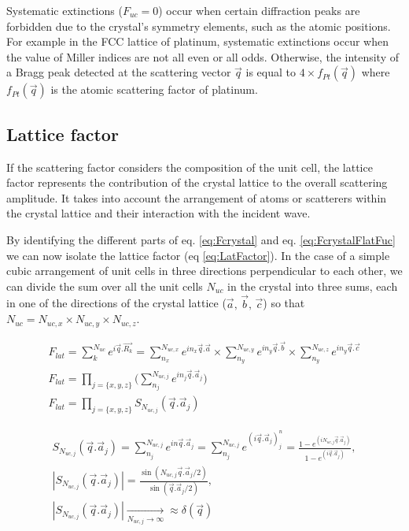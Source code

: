 Systematic extinctions ($F_{uc} = 0$) occur when certain diffraction peaks are forbidden due to the crystal's symmetry elements, such as the atomic positions.
For example in the FCC lattice of platinum, systematic extinctions occur when the value of Miller indices are not all even or all odds.
Otherwise, the intensity of a Bragg peak detected at the scattering vector $\vec{q}$ is equal to $4\times f_{Pt}(\vec{q})$ where $f_{Pt}(\vec{q})$ is the atomic scattering factor of platinum.

\subsection{Lattice factor} \label{sec:LatticeFactor}

If the scattering factor considers the composition of the unit cell, the lattice factor represents the contribution of the crystal lattice to the overall scattering amplitude.
It takes into account the arrangement of atoms or scatterers within the crystal lattice and their interaction with the incident wave.

By identifying the different parts of eq. \ref{eq:Fcrystal} and eq. \ref{eq:FcrystalFlatFuc} we can now isolate the lattice factor (eq \ref{eq:LatFactor}).
In the case of a simple cubic arrangement of unit cells in three directions perpendicular to each other, we can divide the sum over all the unit cells $N_{uc}$ in the crystal into three sums, each in one of the directions of the crystal lattice ($\vec{a}, \, \vec{b}, \, \vec{c}$) so that $N_{uc} = N_{uc, x} \times N_{uc, y} \times N_{uc, z}$.

\begin{gather}
    \label{eq:LatFactor}
    F_{lat} = \sum_k^{N_{uc}} e^{i\vec{q}.\vec{R_k}} = \sum_{n_x}^{N_{uc, x}} e^{i n_x\vec{q}.\vec{a}} \times \sum_{n_y}^{N_{uc, y}} e^{i n_y\vec{q}.\vec{b}} \times \sum_{n_y}^{N_{uc, z}} e^{i n_y\vec{q}.\vec{c}}\\
    F_{lat} = \prod_{j=\{x,y,z\}} \Bigg( \sum_{n_j}^{N_{uc, j}} e^{i n_j\vec{q}.\vec{a}_j} \Bigg)\\
    F_{lat} = \prod_{j=\{x,y,z\}} S_{N_{uc, j}}(\vec{q}.\vec{a}_j)
\end{gather}

\begin{gather}
    \label{eq:SFunction1}
    S_{N_{uc, j}}(\vec{q}.\vec{a}_j) = \sum_{n_j}^{N_{uc, j}} e^{in\vec{q}.\vec{a}_j} = \sum_{n_j}^{N_{uc, j}} e^{(i\vec{q}.\vec{a}_j)^n_j} = \frac{1-e^{(i N_{uc, j} \vec{q}.\vec{a}_j)}}{1-e^{(i\vec{q}.\vec{a}_j)}},\\
    \label{eq:SFunction2}
    |S_{N_{uc, j}}(\vec{q}.\vec{a}_j)| = \frac{\sin(N_{uc, j} \vec{q}.\vec{a}_j/2)}{\sin(\vec{q}.\vec{a}_j/2)},\\
    \label{eq:SFunction3}
    |S_{N_{uc, j}}(\vec{q}.\vec{a}_j)| \underset{N_{uc, j} \to \infty}{\longrightarrow} \approx \delta (\vec{q})
\end{gather}

